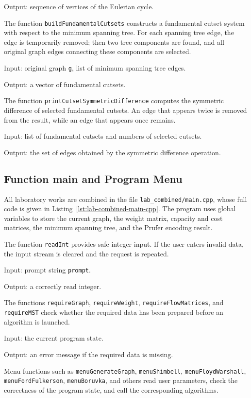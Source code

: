 \documentclass[a4paper,final]{article}
\begin{document}
Output: sequence of vertices of the Eulerian cycle.

The function \texttt{buildFundamentalCutsets} constructs a fundamental cutset system with respect to the minimum spanning tree. For each spanning tree edge, the edge is temporarily removed; then two tree components are found, and all original graph edges connecting these components are selected.

Input: original graph \texttt{g}, list of minimum spanning tree edges.

Output: a vector of fundamental cutsets.

The function \texttt{printCutsetSymmetricDifference} computes the symmetric difference of selected fundamental cutsets. An edge that appears twice is removed from the result, while an edge that appears once remains.

Input: list of fundamental cutsets and numbers of selected cutsets.

Output: the set of edges obtained by the symmetric difference operation.

\subsection{Function main and Program Menu}

All laboratory works are combined in the file \texttt{lab\_combined/main.cpp}, whose full code is given in Listing~\ref{lst:lab-combined-main-cpp}. The program uses global variables to store the current graph, the weight matrix, capacity and cost matrices, the minimum spanning tree, and the Prufer encoding result.

The function \texttt{readInt} provides safe integer input. If the user enters invalid data, the input stream is cleared and the request is repeated.

Input: prompt string \texttt{prompt}.

Output: a correctly read integer.

The functions \texttt{requireGraph}, \texttt{requireWeight}, \texttt{requireFlowMatrices}, and \texttt{requireMST} check whether the required data has been prepared before an algorithm is launched.

Input: the current program state.

Output: an error message if the required data is missing.

Menu functions such as \texttt{menuGenerateGraph}, \texttt{menuShimbell}, \texttt{menuFloydWarshall}, \texttt{menuFordFulkerson}, \texttt{menuBoruvka}, and others read user parameters, check the correctness of the program state, and call the corresponding algorithms.
\end{document}
